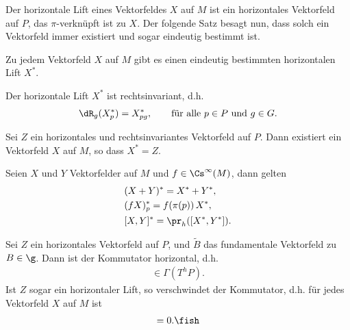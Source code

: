 \documentclass[%
	paper=a5,%
	fleqn,%
	DIV=18,%
	BCOR=0mm,
	fontsize=11pt,
	titlepage=false,%
	bibliography=totoc,
	DIV=18,%
	twoside=true,
	pdftitle=Riemannsche Geometrie,
	pdfauthor=Uwe Semmelmann,
	numbers=noendperiod]%
	{scrbook}
\begin{document}
Der horizontale Lift eines Vektorfeldes $X$ auf $M$ ist ein horizontales
Vektorfeld auf $P$, das $\pi$-verknüpft ist zu $X$. Der folgende Satz besagt nun,
dass solch ein Vektorfeld immer existiert und sogar eindeutig bestimmt ist.

\begin{prop}
\begin{propenum}
\item Zu jedem Vektorfeld $X$ auf $M$ gibt es einen eindeutig bestimmten
horizontalen Lift $X^*$.
\item Der horizontale Lift $X^*$ ist rechtsinvariant, d.h.
\begin{align*}
\dR_g(X_p^*) = X_{pg}^*,\qquad \text{für alle }p\in P\text{ und } g\in G.
\end{align*}
\item Sei $Z$ ein horizontales und rechtsinvariantes Vektorfeld auf  $P$. Dann
existiert ein Vektorfeld $X$ auf $M$, so dass $X^* = Z$.
\item Seien $X$ und $Y$ Vektorfelder auf $M$ und $f\in\Cs^\infty(M)$, dann gelten
\begin{align*}
&(X+Y)^* = X^* + Y^*,\\
&(fX)^*_p = f(\pi(p)) \,  X^*,\\
&[X,Y]^* = \pr_h([X^*,Y^*]).
\end{align*}
\item Sei $Z$ ein horizontales Vektorfeld auf $P$, und $\tilde{B}$ das
fundamentale Vektorfeld zu $B\in\g$. Dann ist der Kommutator horizontal, d.h.
\begin{align*}
[Z,\tilde{B}] \in \Gamma(T^hP).
\end{align*}
Ist $Z$ sogar ein horizontaler Lift, so verschwindet der Kommutator, d.h. für
jedes Vektorfeld $X$ auf $M$ ist
\begin{align*}
[X^*,\tilde{B}] = 0.\fish
\end{align*} 
\end{propenum}
\end{prop}
\end{document}
